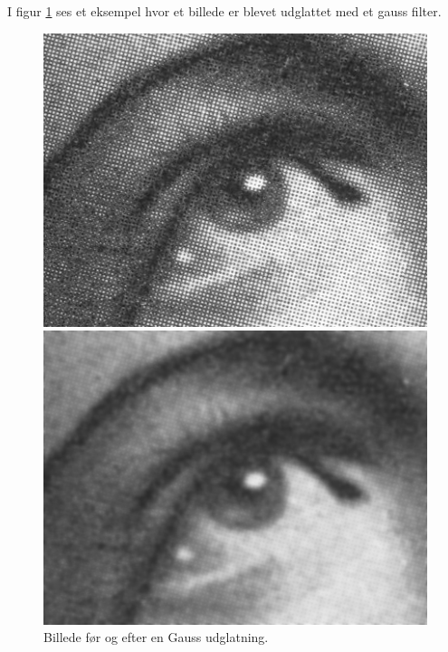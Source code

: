 I figur \ref{fig:premethod_gauss} ses et eksempel hvor et billede er blevet udglattet med et gauss filter. 

\begin{figure}[H]
	\begin{minipage}[b]{0.5\linewidth}
		\centering
		\includegraphics[scale=1.5]{files/premethod/img/gauss_pre.png}
	\end{minipage}
	\hspace{0.5cm}
	\begin{minipage}[b]{0.5\linewidth}
		\centering
		\includegraphics[scale=1.5]{files/premethod/img/gauss_post.png}
	\end{minipage}
	\caption{Billede før og efter en Gauss udglatning.\label{fig:premethod_gauss}}
\end{figure}



